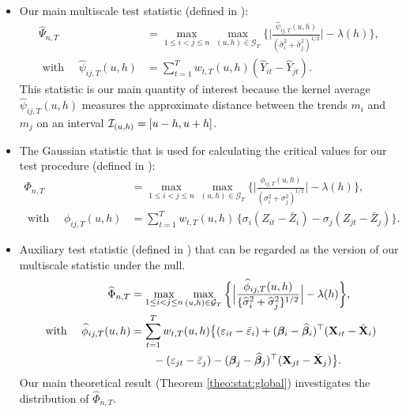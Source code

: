\documentclass[a4paper,12pt]{article}
\makeatletter
\renewcommand{\eqref}[1]{\tagform@{\ref{#1}}}
\makeatother
\begin{document}
\begin{itemize}
\item Our main multiscale test statistic (defined in \eqref{eq:Psi_hat}):
\begin{align*}
	\widehat{\Psi}_{n,T} & = \max_{1 \le i < j \le n} \max_{(u,h) \in \mathcal{G}_T} \bigg\{\Big|\frac{\widehat{\psi}_{ij,T}(u,h)}{(\widehat{\sigma}_i^2 + \widehat{\sigma}_j^2)^{1/2}}\bigg| - \lambda(h)\Bigg\},\\
   \text{ with  } \quad    \widehat{\psi}_{ij,T}(u,h) &= \sum\limits_{t=1}^T w_{t,T}(u,h)(\widehat{Y}_{it} - \widehat{Y}_{jt}). \nonumber
\end{align*}
This statistic is our main quantity of interest because the kernel average $\widehat{\psi}_{ij,T}(u,h)$ measures the approximate distance between the trends $m_i$ and $m_j$ on an interval $\mathcal{I}_{(u, h)} = [u-h, u+h]$.


\item The Gaussian statistic that is used for calculating the critical values for our test procedure (defined in \eqref{eq:Phi}):
\begin{align*}
	\Phi_{n,T}  &= \max_{1 \le i < j \le n} \max_{(u,h) \in \mathcal{G}_T} \bigg\{\Big|\frac{\phi_{ij,T}(u,h)}{({\sigma}_i^2 + {\sigma}_j^2)^{1/2}}\Big| - \lambda(h)\bigg\},\\
   \text{ with  } \quad  	 \phi_{ij,T}(u,h) & = \sum\nolimits_{t=1}^T w_{t,T}(u,h) \, \big\{{\sigma}_i (Z_{it} - \bar{Z}_i) - {\sigma}_j (Z_{jt} - \bar{Z}_j) \big\}.\nonumber
\end{align*}

\item Auxiliary test statistic (defined in \eqref{eq:Phi_hat}) that can be regarded as the version of our multiscale statistic under the null.
\begin{align*}
	\widehat{\Phi}_{n,T} &= \max_{1 \le i < j \le n} \max_{(u,h) \in \mathcal{G}_T} \bigg\{\Big| \frac{\widehat{\phi}_{ij,T}(u,h)} {\{ \widehat{\sigma}_i^2 + \widehat{\sigma}_j^2 \}^{1/2}} \Big| - \lambda(h)\bigg\}, \\
   \text{ with  } \quad  	\widehat{\phi}_{ij,T}(u,h) &= \sum_{t=1}^T w_{t,T}(u,h) \big\{ (\varepsilon_{it} - \bar{\varepsilon}_i) + (\bm{\beta}_i - \widehat{\bm{\beta}}_i)^\top (\mathbf{X}_{it} - \bar{\mathbf{X}}_{i})  \nonumber \\
	&\quad\quad - (\varepsilon_{jt} - \bar{\varepsilon}_j) -  (\bm{\beta}_j - \widehat{\bm{\beta}}_j)^\top (\mathbf{X}_{jt} - \bar{\mathbf{X}}_{j})\big\}.\nonumber 
\end{align*}
Our main theoretical result (Theorem \ref{theo:stat:global}) investigates the distribution of $\widehat{\Phi}_{n,T}$.


\end{itemize}
\end{document}
